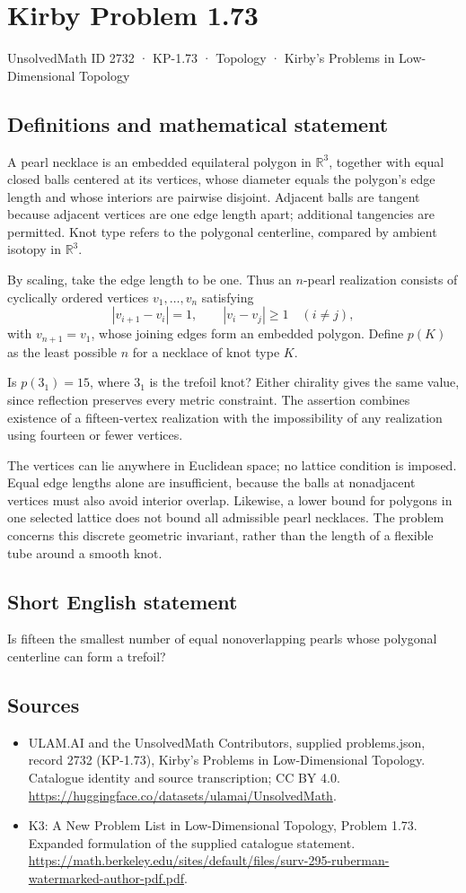 \documentclass[11pt,a4paper]{article}
\begin{document}
\section*{Kirby Problem 1.73}\label{2732}
{\small UnsolvedMath ID 2732 · KP-1.73 · Topology · Kirby's Problems in Low-Dimensional Topology}
\subsection{Definitions and mathematical statement}
A pearl necklace is an embedded equilateral polygon in $\mathbb R^3$, together with equal closed balls centered at its vertices, whose diameter equals the polygon's edge length and whose interiors are pairwise disjoint. Adjacent balls are tangent because adjacent vertices are one edge length apart; additional tangencies are permitted. Knot type refers to the polygonal centerline, compared by ambient isotopy in $\mathbb R^3$.

By scaling, take the edge length to be one. Thus an $n$-pearl realization consists of cyclically ordered vertices $v_1,\ldots,v_n$ satisfying
\[
|v_{i+1}-v_i|=1,\qquad |v_i-v_j|\ge1\quad(i\ne j),
\]
with $v_{n+1}=v_1$, whose joining edges form an embedded polygon. Define $p(K)$ as the least possible $n$ for a necklace of knot type $K$.

Is $p(3_1)=15$, where $3_1$ is the trefoil knot? Either chirality gives the same value, since reflection preserves every metric constraint. The assertion combines existence of a fifteen-vertex realization with the impossibility of any realization using fourteen or fewer vertices.

The vertices can lie anywhere in Euclidean space; no lattice condition is imposed. Equal edge lengths alone are insufficient, because the balls at nonadjacent vertices must also avoid interior overlap. Likewise, a lower bound for polygons in one selected lattice does not bound all admissible pearl necklaces. The problem concerns this discrete geometric invariant, rather than the length of a flexible tube around a smooth knot.
\subsection{Short English statement}
Is fifteen the smallest number of equal nonoverlapping pearls whose polygonal centerline can form a trefoil?
\subsection{Sources}
\begin{itemize}
\item[S1] ULAM.AI and the UnsolvedMath Contributors, supplied problems.json, record 2732 (KP-1.73), Kirby's Problems in Low-Dimensional Topology. Catalogue identity and source transcription; CC BY 4.0.
\url{https://huggingface.co/datasets/ulamai/UnsolvedMath}.
\item[S2] K3: A New Problem List in Low-Dimensional Topology, Problem 1.73. Expanded formulation of the supplied catalogue statement.
\url{https://math.berkeley.edu/sites/default/files/surv-295-ruberman-watermarked-author-pdf.pdf}.
\end{itemize}
\end{document}
